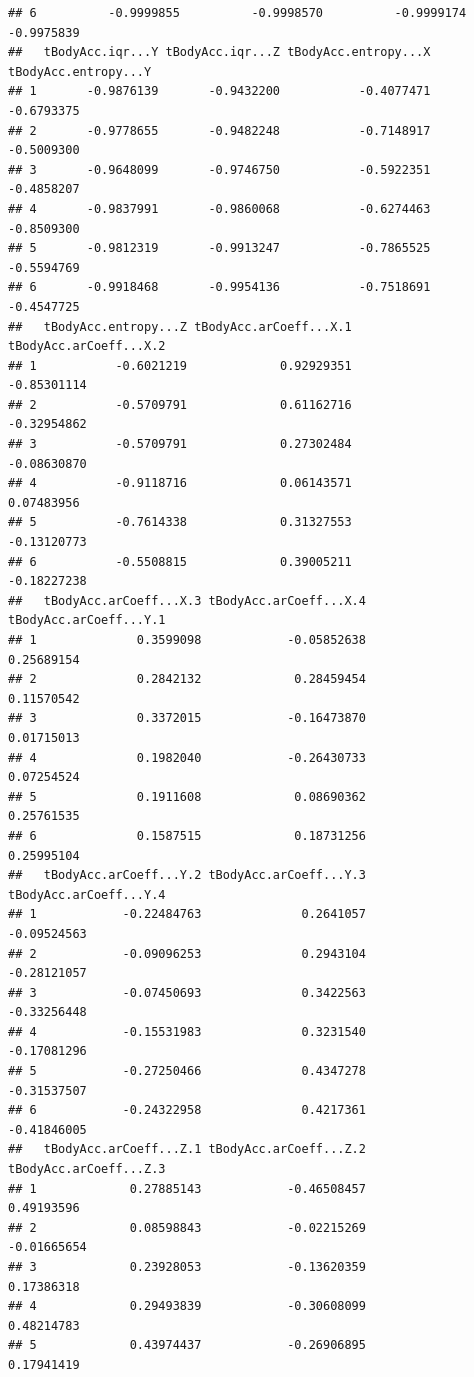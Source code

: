 \documentclass[
]{article}
\begin{document}
\begin{verbatim}
## 6          -0.9999855          -0.9998570          -0.9999174       -0.9975839
##   tBodyAcc.iqr...Y tBodyAcc.iqr...Z tBodyAcc.entropy...X tBodyAcc.entropy...Y
## 1       -0.9876139       -0.9432200           -0.4077471           -0.6793375
## 2       -0.9778655       -0.9482248           -0.7148917           -0.5009300
## 3       -0.9648099       -0.9746750           -0.5922351           -0.4858207
## 4       -0.9837991       -0.9860068           -0.6274463           -0.8509300
## 5       -0.9812319       -0.9913247           -0.7865525           -0.5594769
## 6       -0.9918468       -0.9954136           -0.7518691           -0.4547725
##   tBodyAcc.entropy...Z tBodyAcc.arCoeff...X.1 tBodyAcc.arCoeff...X.2
## 1           -0.6021219             0.92929351            -0.85301114
## 2           -0.5709791             0.61162716            -0.32954862
## 3           -0.5709791             0.27302484            -0.08630870
## 4           -0.9118716             0.06143571             0.07483956
## 5           -0.7614338             0.31327553            -0.13120773
## 6           -0.5508815             0.39005211            -0.18227238
##   tBodyAcc.arCoeff...X.3 tBodyAcc.arCoeff...X.4 tBodyAcc.arCoeff...Y.1
## 1              0.3599098            -0.05852638             0.25689154
## 2              0.2842132             0.28459454             0.11570542
## 3              0.3372015            -0.16473870             0.01715013
## 4              0.1982040            -0.26430733             0.07254524
## 5              0.1911608             0.08690362             0.25761535
## 6              0.1587515             0.18731256             0.25995104
##   tBodyAcc.arCoeff...Y.2 tBodyAcc.arCoeff...Y.3 tBodyAcc.arCoeff...Y.4
## 1            -0.22484763              0.2641057            -0.09524563
## 2            -0.09096253              0.2943104            -0.28121057
## 3            -0.07450693              0.3422563            -0.33256448
## 4            -0.15531983              0.3231540            -0.17081296
## 5            -0.27250466              0.4347278            -0.31537507
## 6            -0.24322958              0.4217361            -0.41846005
##   tBodyAcc.arCoeff...Z.1 tBodyAcc.arCoeff...Z.2 tBodyAcc.arCoeff...Z.3
## 1             0.27885143            -0.46508457             0.49193596
## 2             0.08598843            -0.02215269            -0.01665654
## 3             0.23928053            -0.13620359             0.17386318
## 4             0.29493839            -0.30608099             0.48214783
## 5             0.43974437            -0.26906895             0.17941419

\end{verbatim}
\end{document}
